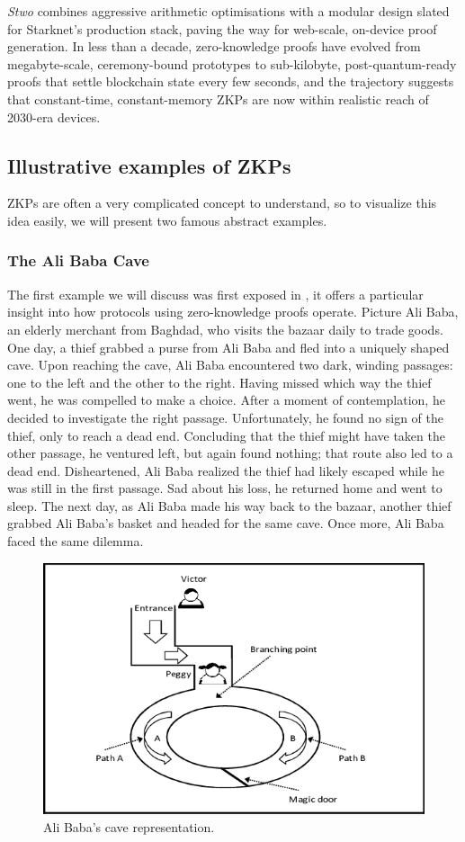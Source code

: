 \textit{Stwo} combines aggressive arithmetic optimisations with a modular design slated for Starknet's production stack, paving the way for web-scale, on-device proof generation.  
In less than a decade, zero-knowledge proofs have evolved from megabyte-scale, ceremony-bound prototypes to sub-kilobyte, post-quantum-ready proofs that settle blockchain state every few seconds, and the trajectory suggests that constant-time, constant-memory ZKPs are now within realistic reach of 2030-era devices.

\subsection{Illustrative examples of ZKPs} \label{zkExamples}
ZKPs are often a very complicated concept to understand, so to visualize this idea easily, we will present two famous abstract examples.
\subsubsection{The Ali Baba Cave} \label{AliBabaCave}

The first example we will discuss was first exposed in \cite{howtoexplainzk}, it offers a particular insight into how protocols using zero-knowledge proofs operate. Picture Ali Baba, an elderly merchant from Baghdad, who visits the bazaar daily to trade goods. One day, a thief grabbed a purse from Ali Baba and fled into a uniquely shaped cave. Upon reaching the cave, Ali Baba encountered two dark, winding passages: one to the left and the other to the right. Having missed which way the thief went, he was compelled to make a choice. After a moment of contemplation, he decided to investigate the right passage. Unfortunately, he found no sign of the thief, only to reach a dead end. Concluding that the thief might have taken the other passage, he ventured left, but again found nothing; that route also led to a dead end.
Disheartened, Ali Baba realized the thief had likely escaped while he was still in the first passage. Sad about his loss, he returned home and went to sleep. The next day, as Ali Baba made his way back to the bazaar, another thief grabbed Ali Baba's basket and headed for the same cave. Once more, Ali Baba faced the same dilemma. 

\begin{figure}[h]
    \centering
    \includegraphics[width=0.7\linewidth]{Images/Chap1/alibaba.png}
    \caption{Ali Baba's cave representation.}
    \label{fig:alibaba}
\end{figure}


